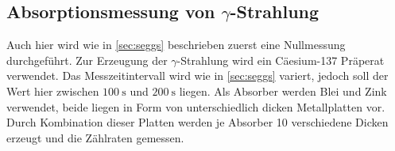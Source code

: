 \subsection{\texorpdfstring{Absorptionsmessung von $\gamma$-Strahlung}{Absorptionsmessung von Gamma-Strahlung}}
Auch hier wird wie in \autoref{sec:seggs} beschrieben zuerst eine Nullmessung durchgeführt.
Zur Erzeugung der $\gamma$-Strahlung wird ein Cäesium-137 Präperat verwendet.
Das Messzeitintervall wird wie in \autoref{sec:seggs} variert, jedoch soll der Wert hier zwischen
$\qty{100}{\second}$ und $\qty{200}{\second}$ liegen.
Als Absorber werden Blei und Zink verwendet, beide liegen in Form von unterschiedlich dicken Metallplatten vor.
Durch Kombination dieser Platten werden je Absorber 10 verschiedene Dicken erzeugt und die Zählraten gemessen.